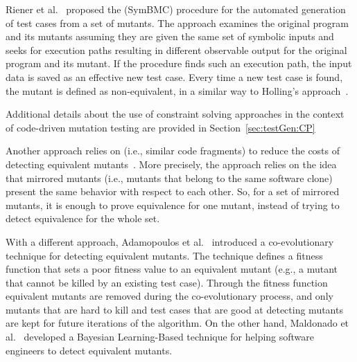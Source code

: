 Riener et al.~\cite{riener2011test} proposed the  (SymBMC) procedure for the automated generation of test cases from a set of mutants. The approach examines the original program and its mutants assuming they are given the same set of symbolic  inputs and seeks for execution paths resulting in different observable output for the original program and its mutant. If the procedure finds such an execution path, the input data is saved as an effective new test case. Every time a new test case is found, the mutant is defined as non-equivalent, in a similar way to Holling's approach~\cite{holling2016nequivack}.

Additional details about the use of constraint solving approaches in the context of code-driven mutation testing are provided in Section~\ref{sec:testGen:CP}

Another approach relies on  (i.e., similar code fragments) to reduce the costs of detecting equivalent mutants~\cite{kintis2013identifying}. More precisely, the approach relies on the idea that mirrored mutants (i.e., mutants that belong to the same software clone) present the same behavior with respect to each other. So, for a set of mirrored mutants, it is enough to prove equivalence for one mutant, instead of trying to detect equivalence for the whole set.

With a different approach, Adamopoulos et al.~\cite{adamopoulos2004overcome} introduced a co-evolutionary technique for detecting equivalent mutants. The technique defines a fitness function that sets a poor fitness value to an equivalent mutant (e.g., a mutant that cannot be killed by an existing test case). Through the fitness function equivalent mutants are removed during the co-evolutionary process, and only mutants that are hard to kill and test cases that are good at detecting mutants are kept for future iterations of the algorithm. On the other hand, Maldonado et al.~\cite{maldonado2005bayesian} developed a Bayesian Learning-Based technique for helping software engineers to detect equivalent mutants.

